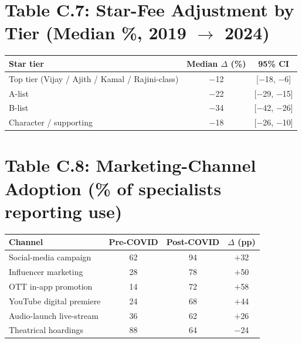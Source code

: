 \section{Table C.7: Star-Fee Adjustment by Tier (Median \%, 2019 $\to$ 2024)}
\begin{tabularx}{\textwidth}{X c c}
\toprule
\textbf{Star tier} & \textbf{Median $\Delta$ (\%)} &
\textbf{95\% CI}\\
\midrule
Top tier (Vijay / Ajith / Kamal / Rajini-class) & $-$12 & [$-$18, $-$6] \\
A-list                                          & $-$22 & [$-$29, $-$15] \\
B-list                                          & $-$34 & [$-$42, $-$26] \\
Character / supporting                          & $-$18 & [$-$26, $-$10] \\
\bottomrule
\end{tabularx}

\section{Table C.8: Marketing-Channel Adoption (\% of specialists
reporting use)}
\begin{tabularx}{\textwidth}{X c c c}
\toprule
\textbf{Channel} & \textbf{Pre-COVID} & \textbf{Post-COVID} &
\textbf{$\Delta$ (pp)}\\
\midrule
Social-media campaign        & 62 & 94 & $+$32 \\
Influencer marketing         & 28 & 78 & $+$50 \\
OTT in-app promotion         & 14 & 72 & $+$58 \\
YouTube digital premiere     & 24 & 68 & $+$44 \\
Audio-launch live-stream     & 36 & 62 & $+$26 \\
Theatrical hoardings         & 88 & 64 & $-$24 \\
\bottomrule
\end{tabularx}

